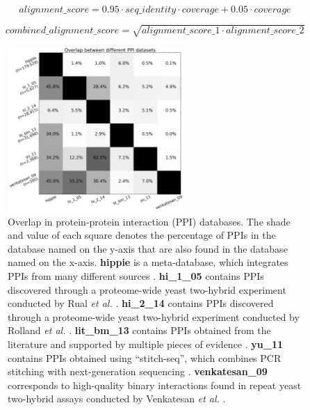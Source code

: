 \begin{equation} \label{eq:core_alignment_score}
	alignment\_score = 0.95 \cdot seq\_identity \cdot coverage + 0.05 \cdot coverage
\end{equation}

\begin{equation} \label{eq:interface_alignment_score}
	combined\_alignment\_score = \sqrt{alignment\_score\_1 \cdot alignment\_score\_2}
\end{equation}


\begin{figure}[!tb]
	\centering
	\includegraphics[width=0.6\textwidth]{static/profs/ppi_database_overlap.png}
	\caption[Overlap in protein-protein interaction databases.]{Overlap in protein-protein interaction (PPI) databases. The shade and value of each square denotes the percentage of PPIs in the database named on the y-axis that are also found in the database named on the x-axis. \textbf{hippie} is a meta-database, which integrates PPIs from many different sources \cite{schaefer_hippie:_2012}. \textbf{hi\_1\_05} contains PPIs discovered through a proteome-wide yeast two-hybrid experiment conducted by Rual \textit{et al.} \cite{rual_towards_2005}. \textbf{hi\_2\_14} contains PPIs discovered through a proteome-wide yeast two-hybrid experiment conducted by Rolland \textit{et al.} \cite{rolland_proteome-scale_2014}. \textbf{lit\_bm\_13} contains PPIs obtained from the literature and supported by multiple pieces of evidence \cite{rolland_proteome-scale_2014}. \textbf{yu\_11} contains PPIs obtained using ``stitch-seq'', which combines PCR stitching with next-generation sequencing \cite{yu_next-generation_2011}. \textbf{venkatesan\_09} corresponds to high-quality binary interactions found in repeat yeast two-hybrid assays conducted by Venkatesan \textit{et al.} \cite{venkatesan_empirical_2009}.}
	\label{fig:ppi_database_overlap}
\end{figure}



